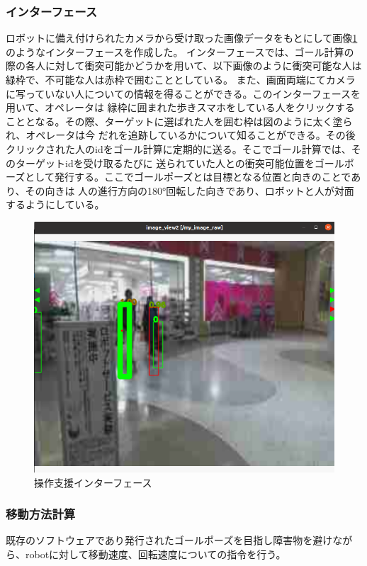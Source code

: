 \documentclass{kuisthesis}
\begin{document}
\subsubsection{インターフェース}
ロボットに備え付けられたカメラから受け取った画像データをもとにして画像\ref{pic:interface}のようなインターフェースを作成した。
インターフェースでは、ゴール計算の際の各人に対して衝突可能かどうかを用いて、以下画像のように衝突可能な人は緑枠で、不可能な人は赤枠で囲むこととしている。
また、画面両端にてカメラに写っていない人についての情報を得ることができる。このインターフェースを用いて、オペレータは
緑枠に囲まれた歩きスマホをしている人をクリックすることとなる。その際、ターゲットに選ばれた人を囲む枠は図のように太く塗られ、オペレータは今
だれを追跡しているかについて知ることができる。その後クリックされた人のidをゴール計算に定期的に送る。そこでゴール計算では、そのターゲットidを受け取るたびに
送られていた人との衝突可能位置をゴールポーズとして発行する。ここでゴールポーズとは目標となる位置と向きのことであり、その向きは
人の進行方向の180°回転した向きであり、ロボットと人が対面するようにしている。
\begin{figure}[H]
  
  \includegraphics[width=15cm]{img/interface.png}
  \caption{操作支援インターフェース}
  \label{pic:interface}
\end{figure}
\subsubsection{移動方法計算}
既存のソフトウェアであり発行されたゴールポーズを目指し障害物を避けながら、robotに対して移動速度、回転速度についての指令を行う。
\end{document}
